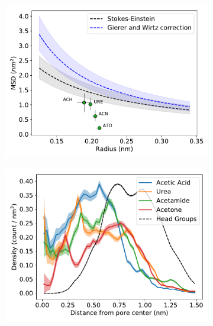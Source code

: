 \documentclass[journal=jpcbfk,manuscript=article]{achemso}
\begin{document}
  \begin{figure}[!htb]
  \centering
  \begin{subfigure}{0.325\textwidth}
  \includegraphics[width=\textwidth]{msd_radius_ketones_10wt.pdf}
  \caption{}\label{fig:ketones_rdf}
  \end{subfigure}
  \begin{subfigure}{0.325\textwidth}
  \includegraphics[width=\textwidth]{ketone_rdf.pdf}
  \caption{}\label{fig:ketones_rdf}
  \end{subfigure}
  \begin{subfigure}{0.325\textwidth}

\end{subfigure}
\end{figure}
\end{document}

